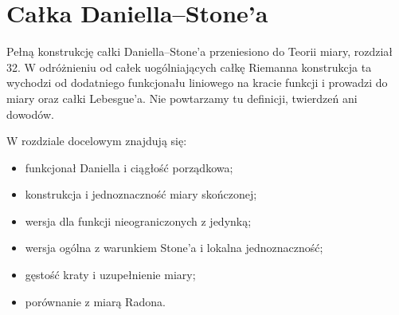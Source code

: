 \providecommand{\atlasref}[2]{#2}
\section{Całka Daniella--Stone'a}

Pełną konstrukcję całki Daniella--Stone'a przeniesiono do
\atlasref{ME-32::ch:daniell-stone-32}{Teorii miary, rozdział 32}.
W odróżnieniu od całek uogólniających całkę Riemanna
konstrukcja ta wychodzi od dodatniego funkcjonału liniowego
na kracie funkcji i prowadzi do miary oraz całki Lebesgue'a.
Nie powtarzamy tu definicji, twierdzeń ani dowodów.

W rozdziale docelowym znajdują się:
\begin{itemize}
 \item \atlasref{ME-32::it:def:daniell-functional}{funkcjonał Daniella i ciągłość porządkowa};
 \item \atlasref{ME-32::it:thm:daniell-stone}{konstrukcja i jednoznaczność miary skończonej};
 \item \atlasref{ME-32::it:thm:daniell-unbounded-unit}{wersja dla funkcji nieograniczonych z jedynką};
 \item \atlasref{ME-32::it:thm:daniell-stone-general}{wersja ogólna z warunkiem Stone'a i lokalna jednoznaczność};
 \item \atlasref{ME-32::it:cor:daniell-general-density}{gęstość kraty i uzupełnienie miary};
 \item \atlasref{ME-32::it:thm:daniell-radon-comparison}{porównanie z miarą Radona}.
\end{itemize}

